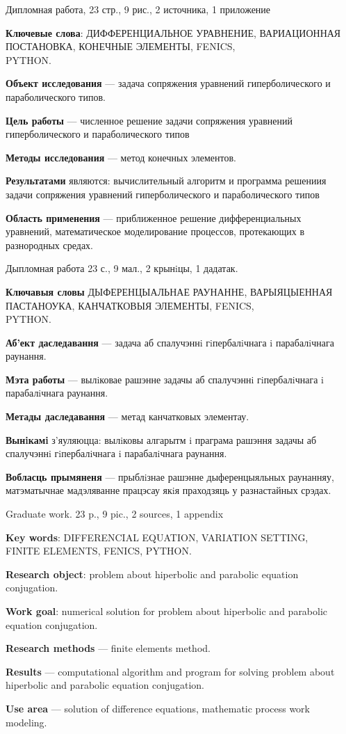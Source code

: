 \pagestyle{plain}
Дипломная работа, 23 стр., 9 рис., 2 источника, 1 приложение

\textbf{Ключевые слова}: ДИФФЕРЕНЦИАЛЬНОЕ УРАВНЕНИЕ, ВАРИАЦИОННАЯ ПОСТАНОВКА, 
КОНЕЧНЫЕ ЭЛЕМЕНТЫ, FENICS, \\ PYTHON.

\textbf{Объект исследования} --- задача сопряжения уравнений гиперболического и параболического типов.

\textbf{Цель работы} --- численное решение задачи сопряжения уравнений гиперболического и параболического типов

\textbf{Методы исследования} --- метод конечных элементов.

\textbf{Результатами} являются: вычислительный алгоритм и программа решениия задачи сопряжения
уравнений гиперболического и параболического типов

\textbf{Область применения} --- приближенное решение дифференциальных \\ уравнений, математическое
моделирование процессов, протекающих в разнородных средах.


Дыпломная работа 23 с., 9 мал., 2 крынiцы, 1 дадатак.

\textbf{Ключавыя словы} ДЫФЕРЕНЦЫАЛЬНАЕ РАУНАННЕ, ВАРЫЯЦЫЕННАЯ ПАСТАНОУКА, КАНЧАТКОВЫЯ ЭЛЕМЕНТЫ,
FENICS, \\ PYTHON.

\textbf{Аб'ект даследавання} --- задача аб спалучэннi гiпербалiчнага i парабалiчнага раунання.

\textbf{Мэта работы} --- вылiковае рашэнне задачы аб спалучэннi гiпербалiчнага i парабалiчнага раунання.

\textbf{Метады даследавання} --- метад канчатковых элементау.

\textbf{Вынiкамi} з'яуляюцца: вылiковы алгарытм i праграма рашэння задачы аб спалучэннi гiпербалiчнага i парабалiчнага раунання.

\textbf{Вобласць прымяненя} --- прыблiзнае рашэнне дыференцыяльных раунанняу, матэматычнае
мадэляванне працэсау якiя праходзяць у разнастайных срэдах. \\


Graduate work. 23 p., 9 pic., 2 sources, 1 appendix

\textbf{Key words}: DIFFERENCIAL EQUATION, VARIATION SETTING,\\ FINITE ELEMENTS, FENICS, PYTHON.

\textbf{Research object}: problem about hiperbolic and parabolic equation \\conjugation.

\textbf{Work goal}: numerical solution for problem about hiperbolic and parabolic equation conjugation.

\textbf{Research methods} --- finite elements method.

\textbf{Results} --- computational algorithm and program for solving problem about hiperbolic
and parabolic equation conjugation.

\textbf{Use area} --- solution of difference equations, mathematic process work \\ modeling.
